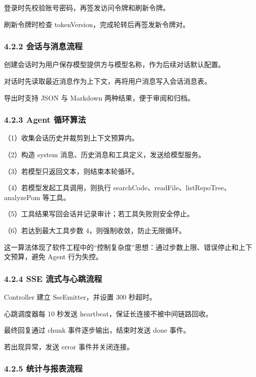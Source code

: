\documentclass[UTF8]{ctexart}
\begin{document}
登录时先校验账号密码，再签发访问令牌和刷新令牌。

刷新令牌时检查 tokenVersion，完成轮转后再签发新令牌对。

\subsubsection{\texorpdfstring{\textbf{4.2.2
会话与消息流程}}{4.2.2 会话与消息流程}}\label{ux4f1aux8bddux4e0eux6d88ux606fux6d41ux7a0b}

创建会话时为用户保存模型提供方与模型名称，作为后续对话默认配置。

对话时先读取最近消息作为上下文，再将用户消息写入会话消息表。

导出时支持 JSON 与 Markdown 两种结果，便于审阅和归档。

\subsubsection{\texorpdfstring{\textbf{4.2.3 Agent
循环算法}}{4.2.3 Agent 循环算法}}\label{agent-ux5faaux73afux7b97ux6cd5}

（1）收集会话历史并裁剪到上下文预算内。

（2）构造 system 消息、历史消息和工具定义，发送给模型服务。

（3）若模型只返回文本，则结束本轮循环。

（4）若模型发起工具调用，则执行
searchCode、readFile、listRepoTree、analyzePom 等工具。

（5）工具结果写回会话并记录审计；若工具失败则安全停止。

（6）若达到最大工具步数 4，则强制收敛，防止无限循环。

这一算法体现了软件工程中的``控制复杂度''思想：通过步数上限、错误停止和上下文预算，避免
Agent 行为失控。

\subsubsection{\texorpdfstring{\textbf{4.2.4 SSE
流式与心跳流程}}{4.2.4 SSE 流式与心跳流程}}\label{sse-ux6d41ux5f0fux4e0eux5fc3ux8df3ux6d41ux7a0b}

Controller 建立 SseEmitter，并设置 300 秒超时。

心跳调度器每 10 秒发送 heartbeat，保证长连接不被中间链路回收。

最终回复通过 chunk 事件逐步输出，结束时发送 done 事件。

若出现异常，发送 error 事件并关闭连接。

\subsubsection{\texorpdfstring{\textbf{4.2.5
统计与报表流程}}{4.2.5 统计与报表流程}}\label{ux7edfux8ba1ux4e0eux62a5ux8868ux6d41ux7a0b}
\end{document}
